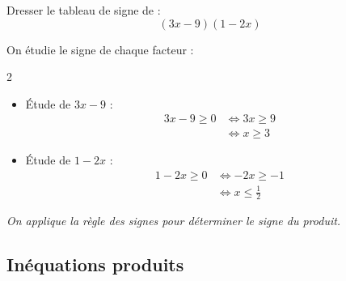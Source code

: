 \begin{methode}
	Dresser le tableau de signe de :
	\[
		(3x - 9)(1 - 2x)
	\]

	\begin{correction}
		On étudie le signe de chaque facteur :
		\begin{multicols}{2}
			\begin{itemize}
				\item {Étude de $3x - 9$ :}
				      \[
					      \begin{aligned}
						      3x - 9 \ge 0 & \iff 3x \ge 9 \\
						                   & \iff x \ge 3
					      \end{aligned}
				      \]
				\item {Étude de $1 - 2x$ :}
				      \[
					      \begin{aligned}
						      1 - 2x \ge 0 & \iff -2x \ge -1         \\
						                   & \iff x \le \tfrac{1}{2}
					      \end{aligned}
				      \]
			\end{itemize}
		\end{multicols}

		\begin{center}
		\end{center}
		\textit{On applique la règle des signes pour déterminer le signe du produit.}
	\end{correction}
\end{methode}

\subsection{Inéquations produits}

